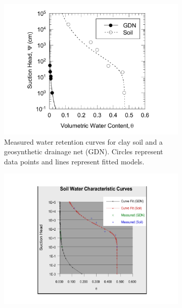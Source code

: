 \documentclass[12pt,letterpaper]{article}
\begin{document}
\begin{figure}
        
        \begin{subfigure}[t]{0.45\linewidth}
                \centering
                \includegraphics[width=1.2\textwidth]{Soil_good}
                \centering
                \caption{Measured water retention curves for clay soil and a geosynthetic drainage net (GDN). Circles represent data points and lines represent fitted models.}
                \label{fig:hydrothermal}
        \end{subfigure}
        \hfill
        \begin{subfigure}[t]{0.45\linewidth}
                \centering
                \includegraphics[width=1.2\textwidth]{Soil_notsogood}
                \label{fig:EGS}
        \end{subfigure}
\end{figure}
\end{document}
